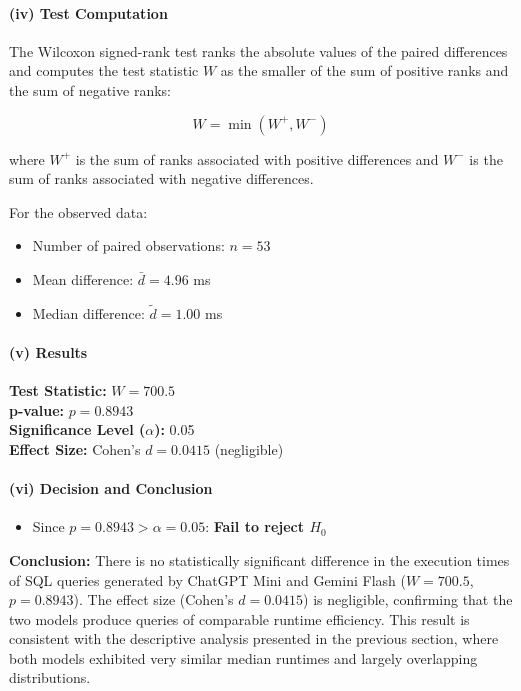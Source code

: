 \documentclass[11pt,a4paper]{article}
\begin{document}
    \paragraph{(iv) Test Computation}
    \quad

    The Wilcoxon signed-rank test ranks the absolute values of the paired differences and computes the test statistic $W$ as the smaller of the sum of positive ranks and the sum of negative ranks:

    \[
    W = \min(W^+, W^-)
    \]

    where $W^+$ is the sum of ranks associated with positive differences and $W^-$ is the sum of ranks associated with negative differences.

    For the observed data:
    \begin{itemize}
        \item Number of paired observations: $n = 53$
        \item Mean difference: $\bar{d} = 4.96$ ms
        \item Median difference: $\tilde{d} = 1.00$ ms
    \end{itemize}

    \paragraph{(v) Results}
    \quad

    \textbf{Test Statistic:} $W = 700.5$ \\
    \textbf{p-value:} $p = 0.8943$ \\
    \textbf{Significance Level ($\alpha$):} 0.05 \\
    \textbf{Effect Size:} Cohen's $d = 0.0415$ (negligible)

    \paragraph{(vi) Decision and Conclusion}
    \quad

    \begin{itemize}
        \item Since $p = 0.8943 > \alpha = 0.05$: \textbf{Fail to reject $H_0$}
    \end{itemize}

    \textbf{Conclusion:} There is no statistically significant difference in the execution times of SQL queries generated by ChatGPT Mini and Gemini Flash ($W = 700.5$, $p = 0.8943$). The effect size (Cohen's $d = 0.0415$) is negligible, confirming that the two models produce queries of comparable runtime efficiency. This result is consistent with the descriptive analysis presented in the previous section, where both models exhibited very similar median runtimes and largely overlapping distributions.
\end{document}
